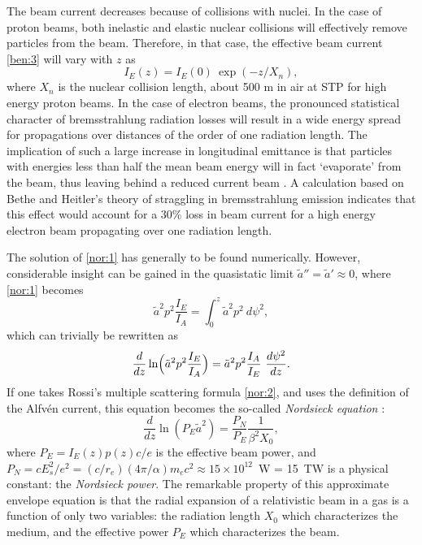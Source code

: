 \documentclass [12pt,a4paper,     ]{report} %
\begin{document}
	The beam current decreases because of collisions with nuclei.  In the case of proton beams, both inelastic and elastic nuclear collisions will effectively remove particles from the beam.  Therefore, in that case, the effective beam current \eqref{ben:3} will vary with $z$ as
%
\begin{equation}\label{nor:6} %
     I_E(z) = I_E(0) ~ \exp(-z/X_n),
\end{equation}
%
where $X_n$ is the nuclear collision length, about 500 m in air at STP for high energy proton beams.  In the case of electron beams, the pronounced statistical character of bremsstrahlung radiation losses will result in a wide energy spread for propagations over distances of the order of one radiation length.  The implication of such a large increase in longitudinal emittance is that particles with energies less than half the mean beam energy will in fact `evaporate' from the beam, thus leaving behind a reduced current beam \cite{HAFTE1979-}.  A calculation based on Bethe and Heitler's theory of straggling in bremsstrahlung emission \cite{ROSSI1952-} indicates that this effect would account for a 30\% loss in beam current for a high energy electron beam propagating over one radiation length.

	The solution of \eqref{nor:1} has generally to be found numerically.  However, considerable insight can be gained in the quasistatic limit  $\tilde{a}'' = \tilde{a}' \approx 0$,  where \eqref{nor:1} becomes
%
\begin{equation}\label{nor:7} %
    \tilde{a}^2p^2\frac{I_E}{I_A} 
   = \int_0^z \tilde{a}^2p^2 ~ d\psi^2,
\end{equation}
%
which can trivially be rewritten as 
%
\begin{equation}\label{nor:8} %
  \frac{d}{dz} \ln \Bigl( \tilde{a}^2p^2 \frac{I_E}{I_A} \Bigr)
                        = \tilde{a}^2p^2 \frac{I_A}{I_E} ~\frac{d\psi^2}{dz}.
\end{equation}
%
If one takes Rossi's multiple scattering formula \eqref{nor:2}, and uses the definition of the Alfv\'en current, this equation becomes the so-called \emph{Nordsieck equation} \cite{LEE--1973C,LEE--1976A,LEE--1976B}:
%
\begin{equation}\label{nor:9} %
  \frac{d}{dz} \ln (P_E\tilde{a}^2) = \frac{P_N}{P_E} \frac{1}{\beta^2 X_0}, 
\end{equation}
%
where $P_E = I_E(z) p(z) c/e$ is the effective beam power, and $P_N = c E_s^2/e^2 = (c/r_e)(4\pi/\alpha) m_ec^2 \approx 15\times 10^{12}$~W = 15~TW is a physical constant: the \emph{Nordsieck power}.  The remarkable property of this approximate envelope equation is that the radial expansion of a relativistic beam in a gas is a function of only two variables: the radiation length $X_0$ which characterizes the medium, and the effective power $P_E$ which characterizes the beam.
\end{document}

